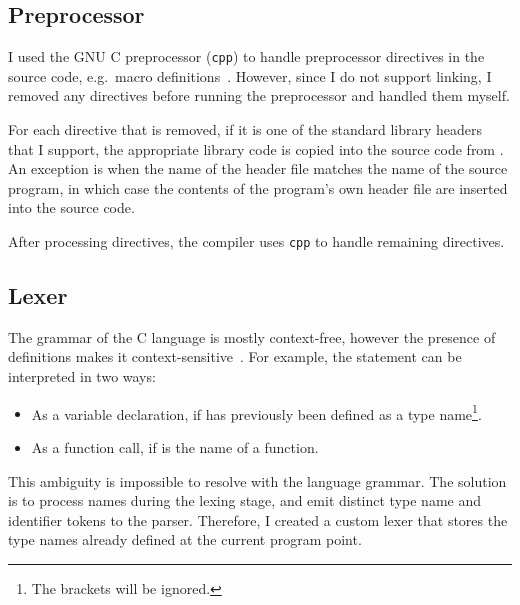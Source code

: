 \documentclass[00-main.tex]{subfiles}
\begin{document}
\subsection{Preprocessor}

I used the GNU C preprocessor (\texttt{cpp}) to handle preprocessor directives in the source code, e.g.~macro definitions~.
However, since I do not support linking, I removed any  directives before running the preprocessor and handled them myself.

For each  directive that is removed, if it is one of the standard library headers that I support, the appropriate library code is copied into the source code from .
An exception is when the name of the header file matches the name of the source program, in which case the contents of the program's own header file are inserted into the source code.

After processing  directives, the compiler uses \texttt{cpp} to handle remaining directives.

\subsection{Lexer}\label{sec:impl:lexer}

The grammar of the C language is mostly context-free, however the presence of  definitions makes it context-sensitive~.
For example, the statement  can be interpreted in two ways:
\begin{itemize}[nosep]
\item As a variable declaration, if  has previously been defined as a type name\footnote{The brackets will be ignored.}.
\item As a function call, if  is the name of a function.
\end{itemize}

This ambiguity is impossible to resolve with the language grammar. The solution is to process  names during the lexing stage, and emit distinct type name and identifier tokens to the parser.
Therefore, I created a custom lexer that stores the type names already defined at the current program point.
\end{document}
